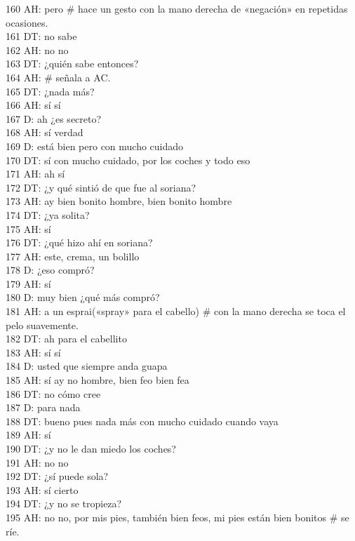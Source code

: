 160 AH: pero \# hace un gesto con la mano derecha de «negación» en repetidas ocasiones.\\
161 DT: no sabe\\
162 AH: no no\\
163 DT: ¿quién sabe entonces?\\
164 AH: \# señala a AC.\\
165 DT: ¿nada más?\\
166 AH: sí sí\\
167 D: ah ¿es secreto?\\
168 AH: sí verdad\\
169 D: está bien pero con mucho cuidado\\
170 DT: sí con mucho cuidado, por los coches y todo eso\\
171 AH: ah sí\\
172 DT: ¿y qué sintió de que fue al soriana?\\
173 AH: ay bien bonito hombre, bien bonito hombre\\
174 DT: ¿ya solita?\\
175 AH: sí\\
176 DT: ¿qué hizo ahí en soriana?\\
177 AH: este, crema, un bolillo\\
178 D: ¿eso compró?\\
179 AH: sí\\
180 D: muy bien ¿qué más compró?\\
181 AH: a un esprai(«spray» para el cabello) \# con la mano derecha se toca el pelo suavemente.\\
182 DT: ah para el cabellito\\
183 AH: sí sí\\
184 D: usted que siempre anda guapa\\
185 AH: sí ay no hombre, bien feo bien fea\\
186 DT: no cómo cree\\
187 D: para nada\\
188 DT: bueno pues nada más con mucho cuidado cuando vaya\\
189 AH: sí\\
190 DT: ¿y no le dan miedo los coches?\\
191 AH: no no\\
192 DT: ¿sí puede sola?\\
193 AH: sí cierto\\
194 DT: ¿y no se tropieza?\\
195 AH: no no, por mis pies, también bien feos, mi pies están bien bonitos \# se ríe.\\
